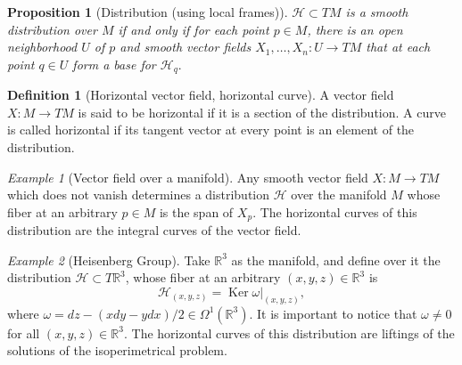 \documentclass [xcolor=svgnames, t] {beamer}
\theoremstyle{definition}
\newtheorem{df}{Definition}
\theoremstyle{plain}
\newtheorem{prop}{Proposition}
\theoremstyle{remark}
\newtheorem{ex}{Example}
\begin{document}
\begin{frame}[fragile]
	
\begin{prop} [Distribution (using local frames)]
	$ \mathcal{H}\subset TM $ is a smooth distribution over $M  $ if and only if  for each point $ p\in M $, there is an open neighborhood $ U $ of $ p $  and smooth vector fields $ X_1,\dots,X_n: U \rightarrow {TM} $ that at each point  $ q\in U $ form a base for $ \mathcal{H}_q. $ 
\end{prop}
\begin{df}[Horizontal vector field, horizontal curve]
	A vector field $ X: M \rightarrow TM $ is said to be horizontal if it is a section of the distribution. A curve is called horizontal if its tangent vector at every point is an element of the distribution.	
\end{df}
\end{frame}
\begin{frame}[fragile]
\begin{ex}[Vector field over a manifold]\label{ex:vect_field}
Any smooth vector field $ X: M \rightarrow {TM} $ which does not vanish  determines a distribution $ \mathcal{H}$ over the manifold $ M $ whose fiber at an arbitrary $ p\in M $ is the span of $ X_p. $ The horizontal curves of this distribution are the integral curves of the vector field.
\end{ex}
\begin{ex}[Heisenberg Group]\label{ex:heis_group}
	Take $ \mathbb{R} ^3 $ as the manifold, and define over it the distribution $ \mathcal{H}\subset T \mathbb{R} ^3 $, whose fiber at an arbitrary $ (x,y,z)\in \mathbb{R}^3  $ is   
	$$ \mathcal{H}_{(x,y,z)} = \operatorname{Ker} \omega|_{(x,y,z)},$$
	where $ \omega = dz-(x dy-y dx)/2\in\Omega^1( \mathbb{R}^3).$ It is important to notice that $ \omega\neq 0 $ for all $ (x,y,z)\in \mathbb{R}^3. $ The horizontal curves of this distribution are liftings of the solutions of the isoperimetrical problem.
\end{ex}
\end{frame}
\end{document}
